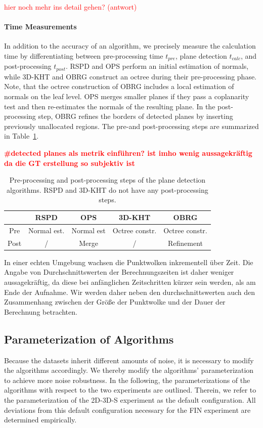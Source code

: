 \documentclass[main.tex]{subfiles}
\begin{document}
\textcolor{red}{hier noch mehr ins detail gehen? (antwort) \underline{\hspace{2cm}}}

\paragraph{Time Measurements}
\label{par:time}
In addition to the accuracy of an algorithm, we precisely measure the calculation time by differentiating between pre-processing time $t_{pre}$, 
plane detection $t_{calc}$, and post-processing $t_{post}$.
RSPD and OPS perform an initial estimation of normals, while 3D-KHT and OBRG construct an octree during their
pre-processing phase. Note, that the octree construction of OBRG includes a local estimation of normals on the
leaf level. OPS merges smaller planes if they pass a coplanarity test and then re-estimates the normals of the
resulting plane. In the post-processing step, OBRG refines the borders of detected planes by inserting
previously unallocated regions.
The pre-and post-processing steps are summarized in Table~\ref{tab:pre-post}.

\textbf{\textcolor{red}{\#detected planes als metrik einführen? ist imho wenig aussagekräftig da die GT erstellung so subjektiv ist}}

\begin{table}[H]
    \centering
    \begin{tabular}{c|cccc}
             & RSPD        & OPS        & 3D-KHT         & OBRG           \\ \hline
        Pre  & Normal est. & Normal est & Octree constr. & Octree constr. \\
        Post & /           & Merge      & /              & Refinement
    \end{tabular}
    \caption{Pre-processing and post-processing steps of the plane detection algorithms. RSPD and 3D-KHT do not have any post-processing steps.}
    \label{tab:pre-post}
\end{table}

In einer echten Umgebung wachsen die Punktwolken inkrementell über Zeit. 
Die Angabe von Durchschnittswerten der Berechnungszeiten ist daher weniger aussagekräftig, da diese bei anfänglichen Zeitschritten 
kürzer sein werden, als am Ende der Aufnahme. Wir werden daher neben den durchschnittswerten auch 
den Zusammenhang zwischen der Größe der Punktwolke und der Dauer der Berechnung betrachten.

\subsection{Parameterization of Algorithms}
Because the datasets inherit different amounts of noise, it is necessary to modify the algorithms accordingly.
We thereby modify the algorithms' parameterization to achieve more noise robustness.
In the following, the parameterizations of the algorithms with respect to the two experiments are outlined.
Therein, we refer to the parameterization of the 2D-3D-S experiment as the default configuration.
All deviations from this default configuration necessary for the FIN experiment are determined empirically.
\end{document}

